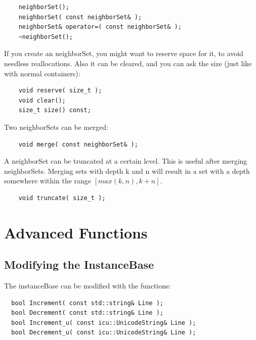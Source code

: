 \documentclass{report}
\begin{document}
\begin{footnotesize}
\begin{verbatim}
    neighborSet();
    neighborSet( const neighborSet& );
    neighborSet& operator=( const neighborSet& );
    ~neighborSet();
\end{verbatim}
\end{footnotesize}

If you create an neighborSet, you might want to reserve space for it,
to avoid needless reallocations. Also it can be cleared, and you can
ask the size (just like with normal containers):

\begin{footnotesize}
\begin{verbatim}
    void reserve( size_t );
    void clear();
    size_t size() const;
\end{verbatim}
\end{footnotesize}

Two neighborSets can be merged:

\begin{footnotesize}
\begin{verbatim}
    void merge( const neighborSet& );
\end{verbatim}
\end{footnotesize}

A neighborSet can be truncated at a certain level. This is useful
after merging neighborSets. Merging sets with depth k and n will
result in a set with a depth somewhere within the range $[max(k,n), k+n]$.

\begin{footnotesize}
\begin{verbatim}
    void truncate( size_t );
\end{verbatim}
\end{footnotesize}

\chapter{Advanced Functions}

\section{Modifying the InstanceBase}

The instanceBase can be modified with the functions:

\begin{footnotesize}
\begin{verbatim}
  bool Increment( const std::string& Line );
  bool Decrement( const std::string& Line );
  bool Increment_u( const icu::UnicodeString& Line );
  bool Decrement_u( const icu::UnicodeString& Line );
\end{verbatim}
\end{footnotesize}
\end{document}
